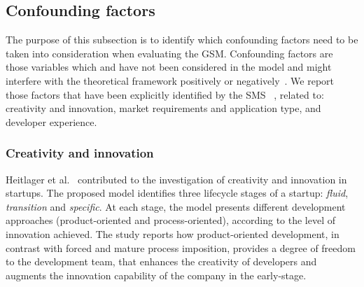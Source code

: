 \documentclass[10pt,journal,letterpaper,compsoc]{IEEEtran}
\begin{document}
\subsection{Confounding factors} \label{sect:an:comp:cat-vs-literature:conf}

The purpose of this subsection is to identify which confounding factors need to
be taken into consideration when evaluating the GSM. Confounding factors are
those variables which and have not been considered in the model and might
interfere with the theoretical framework positively or 
negatively~\cite{ColinRobson2009}. We report those factors that have been 
explicitly identified by the SMS~\cite{SMS} 
, related to: creativity and innovation, market requirements and application 
type, and developer experience.

\subsubsection{Creativity and innovation}
Heitlager et al.~\cite{Heitlager2007} contributed to the investigation of
creativity and innovation in startups. 
The proposed model identifies three lifecycle stages of a startup: 
\textit{fluid}, \textit{transition} and \textit{specific}. At each
stage, the model presents different development approaches (product-oriented
and process-oriented), according to the level of innovation achieved. The study
reports how product-oriented development, in contrast with forced and mature
process imposition, provides a degree of freedom to the development team, that
enhances the creativity of developers and augments the innovation capability of
the company in the early-stage.
\end{document}

